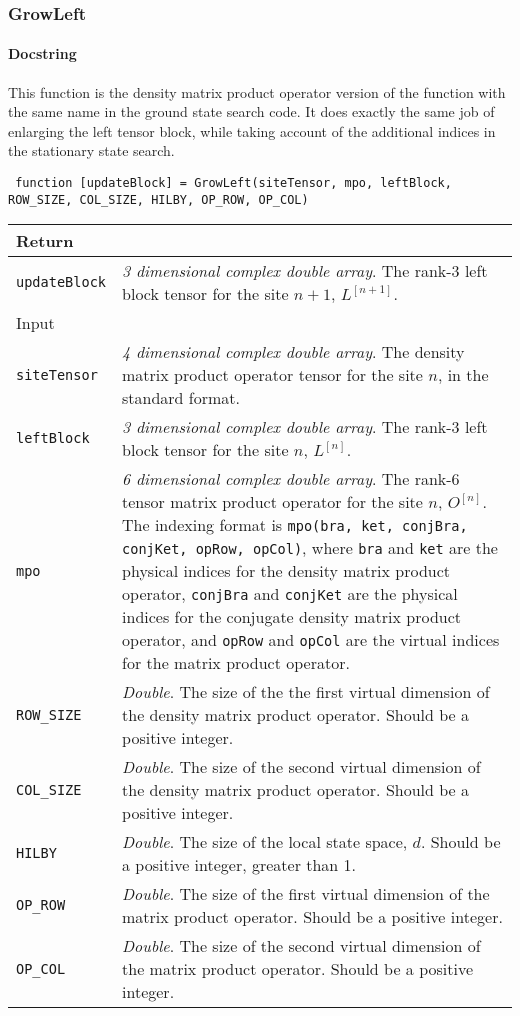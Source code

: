  \subsubsection{GrowLeft}
 \paragraph{Docstring} This function is the density matrix product operator version of the function with the same name in the ground state search code. It does exactly the same job of enlarging the left tensor block, while taking account of the additional indices in the stationary state search.
 \begin{lstlisting}
 function [updateBlock] = GrowLeft(siteTensor, mpo, leftBlock, ROW_SIZE, COL_SIZE, HILBY, OP_ROW, OP_COL) \end{lstlisting}
 \begin{longtabu}{X[1,l]X[4,l]}
 \hline
 Return & \\ \hline
 \lstinline$updateBlock$ & \emph{3 dimensional complex double array}. The rank-3 left block tensor for the site \(n + 1\), \(L^{[n+1]}\). \\ \hline
 Input & \\ \hline
 \lstinline$siteTensor$ & \emph{4 dimensional complex double array}. The density matrix product operator tensor for the site \(n\), in the standard format. \\
 \lstinline$leftBlock$ & \emph{3 dimensional complex double array}. The rank-3 left block tensor for the site \(n\), \(L^{[n]}\). \\
 \lstinline$mpo$ & \emph{6 dimensional complex double array}. The rank-6 tensor matrix product operator for the site \(n\), \(O^{[n]}\). The indexing format is \lstinline$mpo(bra, ket, conjBra, conjKet, opRow, opCol)$, where \lstinline$bra$ and \lstinline$ket$ are the physical indices for the density matrix product operator, \lstinline$conjBra$ and \lstinline$conjKet$ are the physical indices for the conjugate density matrix product operator, and \lstinline$opRow$ and \lstinline$opCol$ are the virtual indices for the matrix product operator. \\
 \lstinline$ROW_SIZE$ & \emph{Double}. The size of the the first virtual dimension of the density matrix product operator. Should be a positive integer. \\
 \lstinline$COL_SIZE$ & \emph{Double}. The size of the second virtual dimension of the density matrix product operator. Should be a positive integer. \\ 
 \lstinline$HILBY$ & \emph{Double}. The size of the local state space, \(d\). Should be a positive integer, greater than 1. \\
 \lstinline$OP_ROW$ & \emph{Double}. The size of the first virtual dimension of the matrix product operator. Should be a positive integer. \\
 \lstinline$OP_COL$ & \emph{Double}. The size of the second virtual dimension of the matrix product operator. Should be a positive integer. \\
 \hline
 \end{longtabu}
